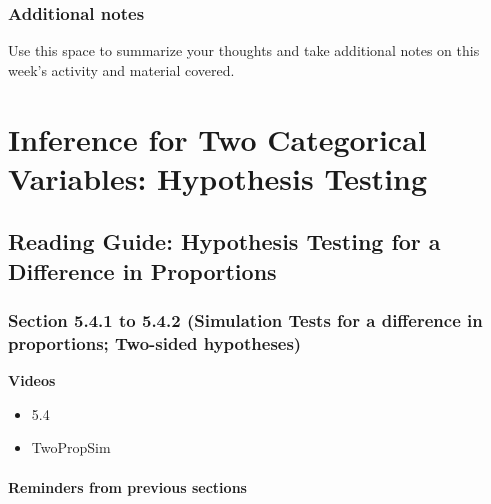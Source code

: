 \documentclass[
]{report}
\providecommand{\tightlist}{%
  \setlength{\itemsep}{0pt}\setlength{\parskip}{0pt}}
\begin{document}
\hypertarget{additional-notes-6}{%
\subsection{Additional notes}\label{additional-notes-6}}

Use this space to summarize your thoughts and take additional notes on this week's activity and material covered.

\hypertarget{inference-for-two-categorical-variables-hypothesis-testing}{%
\chapter{Inference for Two Categorical Variables: Hypothesis Testing}\label{inference-for-two-categorical-variables-hypothesis-testing}}

\hypertarget{reading-guide-hypothesis-testing-for-a-difference-in-proportions}{%
\section{Reading Guide: Hypothesis Testing for a Difference in Proportions}\label{reading-guide-hypothesis-testing-for-a-difference-in-proportions}}

\hypertarget{section-5.4.1-to-5.4.2-simulation-tests-for-a-difference-in-proportions-two-sided-hypotheses}{%
\subsection*{Section 5.4.1 to 5.4.2 (Simulation Tests for a difference in proportions; Two-sided hypotheses)}\label{section-5.4.1-to-5.4.2-simulation-tests-for-a-difference-in-proportions-two-sided-hypotheses}}

\textbf{Videos}

\begin{itemize}
\tightlist
\item
  5.4
\item
  TwoPropSim
\end{itemize}


\hypertarget{reminders-from-previous-sections-2}{%
\subsubsection*{Reminders from previous sections}\label{reminders-from-previous-sections-2}}
\end{document}
